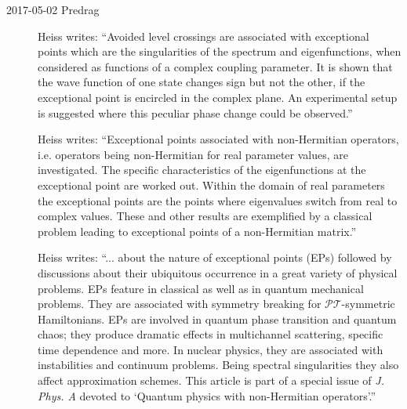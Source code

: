 \begin{description}
\item[2017-05-02 Predrag]
Heiss writes:
``Avoided level crossings are associated with exceptional points which are
the singularities of the spectrum and eigenfunctions, when considered as
functions of a complex coupling parameter. It is shown that the wave function
of one state changes sign but not the other, if the exceptional point is
encircled in the complex plane. An experimental setup is suggested where this
peculiar phase change could be observed.''

Heiss writes:
``Exceptional points associated with non-Hermitian operators, i.e. operators
being non-Hermitian for real parameter values, are investigated. The specific
characteristics of the eigenfunctions at the exceptional point are worked
out. Within the domain of real parameters the exceptional points are the
points where eigenvalues switch from real to complex values. These and other
results are exemplified by a classical problem leading to exceptional points
of a non-Hermitian matrix.''

Heiss writes:
``... about the nature of exceptional points (EPs) followed by discussions
about their ubiquitous occurrence in a great variety of physical problems.
EPs feature in classical as well as in quantum mechanical problems. They are
associated with symmetry breaking for {${\mathcal P}{\mathcal T}$}-symmetric
Hamiltonians. EPs are involved in quantum phase transition and quantum chaos;
they produce dramatic effects in multichannel scattering, specific time
dependence and more. In nuclear physics, they are associated with
instabilities and continuum problems. Being spectral singularities they also
affect approximation schemes. This article is part of a special issue of
\emph{J. Phys. A} devoted to `Quantum physics with non-Hermitian
operators'.''


\end{description}
